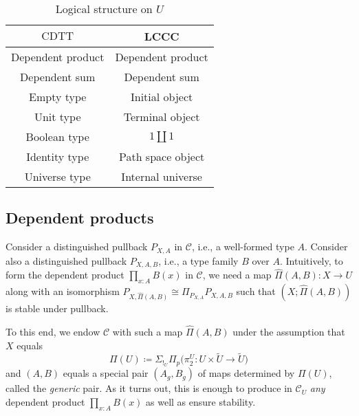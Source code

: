 \documentclass[10pt,letterpaper,cm]{nupset}
\theoremstyle{definition}
\theoremstyle{theorem}
\theoremstyle{remark}
\newcommand{\0}{\mathbf{0}}
\newcommand{\1}{\mathbf{1}}
\newcommand{\2}{\mathbf{2}}
\DeclareMathOperator{\cdtt}{\mathrm{CDTT}}
\renewcommand{\c}{\mathscr{C}}
\begin{document}
\begin{table}[h!]
\centering
\caption{Logical structure on $U$}
\label{table:3}
\begin{tabular}{||c c||} 
 \hline
 $\cdtt$ & LCCC \\ [0.5ex] 
 \hline\hline
 Dependent product &  Dependent product \\ 
 Dependent sum &  Dependent sum  \\
  Empty type & Initial object  \\
   Unit type & Terminal object  \\
    Boolean type & $1 \coprod 1$  \\
 Identity type & Path space object  \\
 Universe type & Internal universe  \\ [1ex] 
 \hline
\end{tabular}
\label{tab:ustr}
\end{table}



\subsection*{Dependent products}
 Consider a distinguished pullback $P_{X,A}$ in $\c$, i.e., a  well-formed type $A$. Consider also a distinguished pullback $P_{X, A, B}$, i.e., a type family $B$ over $A$. Intuitively, to form the dependent product $\prod_{x:A}B(x)$ in $\c$, we need a map $\hat{\Pi}(A,B) : X\to U$ along with an isomorphism $P_{X, \hat{\Pi}(A,B)} \cong  \Pi_{P_{X,A}}{P_{X, A, B}}$ such that $\left(X; \hat{\Pi}(A,B)\right) $ is stable under pullback.  
 
 \smallskip
 
 To this end, we endow $\c$ with such a map  $ \hat{\Pi}(A,B)$ under the assumption that $X$ equals
 $$ \Pi(U) \coloneqq  \Sigma_{!_U}\Pi_{p}\big(\pi_2^U : U \times \tilde{U}\to \tilde{U}\big)$$ and 
$\left(A, B\right)$ equals a special pair $\left(A_g, B_g\right)$ of maps determined by $\Pi(U)$, called the \textit{generic} pair.
As it turns out, this is enough to produce in $\c_U$ \emph{any} dependent product $\prod_{x:A}B(x)$ as well as ensure stability. 
\end{document}
